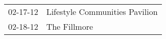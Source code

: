 \begin{supertabular}{p{0.07\textwidth}p{0.23\textwidth}}
 02-17-12 &  Lifestyle Communities Pavilion \\
 02-18-12 &                    The Fillmore \\
\end{supertabular}
